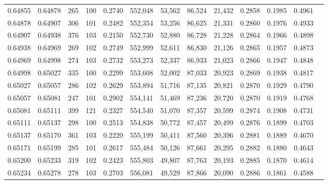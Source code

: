 \begin{tabular}{rrrrrrrrrrrrr}
0.64855 & 0.64878 &   265 & 100 &                                     0.2740 & 552,048 &  53,562 &  86,524 &  21,432 & 0.2858 & 0.1985 & 0.4961 \\
0.64878 & 0.64907 &   306 & 101 &                                     0.2482 & 552,354 &  53,256 &  86,625 &  21,331 & 0.2860 & 0.1976 & 0.4933 \\
0.64907 & 0.64938 &   376 & 103 &                                     0.2150 & 552,730 &  52,880 &  86,728 &  21,228 & 0.2864 & 0.1966 & 0.4898 \\
0.64938 & 0.64969 &   269 & 102 &                                     0.2749 & 552,999 &  52,611 &  86,830 &  21,126 & 0.2865 & 0.1957 & 0.4873 \\
0.64969 & 0.64998 &   274 & 103 &                                     0.2732 & 553,273 &  52,337 &  86,933 &  21,023 & 0.2866 & 0.1947 & 0.4848 \\
0.64998 & 0.65027 &   335 & 100 &                                     0.2299 & 553,608 &  52,002 &  87,033 &  20,923 & 0.2869 & 0.1938 & 0.4817 \\
0.65027 & 0.65057 &   286 & 102 &                                     0.2629 & 553,894 &  51,716 &  87,135 &  20,821 & 0.2870 & 0.1929 & 0.4790 \\
0.65057 & 0.65081 &   247 & 101 &                                     0.2902 & 554,141 &  51,469 &  87,236 &  20,720 & 0.2870 & 0.1919 & 0.4768 \\
0.65081 & 0.65111 &   399 & 121 &                                     0.2327 & 554,540 &  51,070 &  87,357 &  20,599 & 0.2874 & 0.1908 & 0.4731 \\
0.65111 & 0.65137 &   298 & 100 &                                     0.2513 & 554,838 &  50,772 &  87,457 &  20,499 & 0.2876 & 0.1899 & 0.4703 \\
0.65137 & 0.65170 &   361 & 103 &                                     0.2220 & 555,199 &  50,411 &  87,560 &  20,396 & 0.2881 & 0.1889 & 0.4670 \\
0.65171 & 0.65199 &   285 & 101 &                                     0.2617 & 555,484 &  50,126 &  87,661 &  20,295 & 0.2882 & 0.1880 & 0.4643 \\
0.65200 & 0.65233 &   319 & 102 &                                     0.2423 & 555,803 &  49,807 &  87,763 &  20,193 & 0.2885 & 0.1870 & 0.4614 \\
0.65234 & 0.65278 &   278 & 103 &                                     0.2703 & 556,081 &  49,529 &  87,866 &  20,090 & 0.2886 & 0.1861 & 0.4588 \\

\end{tabular}

